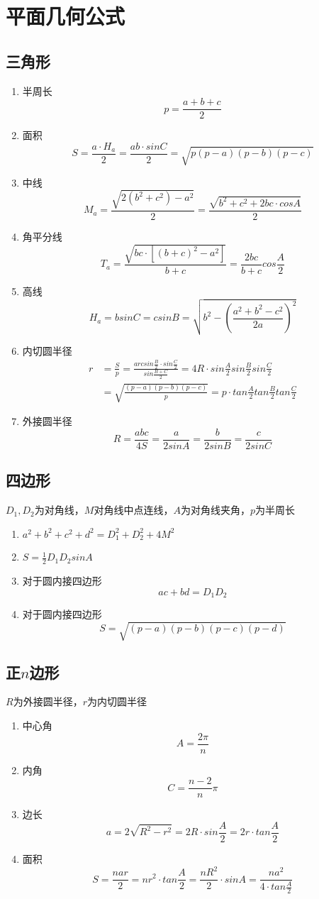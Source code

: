 \section{平面几何公式}
\subsection{三角形}
	\begin{enumerate}
		\item 半周长
			$$p=\frac{a+b+c}{2}$$
		\item 面积
			$$S=\frac{a \cdot H_a}{2}=\frac{ab \cdot sinC}{2}=\sqrt{p(p-a)(p-b)(p-c)}$$
		\item 中线
			$$M_a=\frac{\sqrt{2(b^2+c^2)-a^2}}{2}=\frac{\sqrt{b^2+c^2+2bc \cdot cosA}}{2}$$
		\item 角平分线 
			$$T_a=\frac{\sqrt{bc \cdot [(b+c)^2-a^2]}}{b+c}=\frac{2bc}{b+c}cos\frac{A}{2}$$
		\item 高线
			$$H_a=bsinC=csinB=\sqrt{b^2-(\frac{a^2+b^2-c^2}{2a})^2}$$
		\item 内切圆半径
			\begin{align*}
				r&=\frac{S}{p}=\frac{arcsin\frac{B}{2} \cdot sin\frac{C}{2}}{sin\frac{B+C}{2}}=4R \cdot sin\frac{A}{2}sin\frac{B}{2}sin\frac{C}{2}\\
				&=\sqrt{\frac{(p-a)(p-b)(p-c)}{p}}=p \cdot tan\frac{A}{2}tan\frac{B}{2}tan\frac{C}{2}
			\end{align*}
		\item 外接圆半径
			$$R=\frac{abc}{4S}=\frac{a}{2sinA}=\frac{b}{2sinB}=\frac{c}{2sinC}$$
	\end{enumerate}
\subsection{四边形}
	$D_1, D_2$为对角线，$M$对角线中点连线，$A$为对角线夹角，$p$为半周长
	\begin{enumerate}
		\item $a^2+b^2+c^2+d^2=D_1^2+D_2^2+4M^2$
		\item $S=\frac{1}{2}D_1D_2sinA$
		\item 对于圆内接四边形
			$$ac+bd=D_1D_2$$
		\item 对于圆内接四边形
			$$S=\sqrt{(p-a)(p-b)(p-c)(p-d)}$$
	\end{enumerate}
\subsection{正$n$边形}
	$R$为外接圆半径，$r$为内切圆半径
	\begin{enumerate}
		\item 中心角
			$$A=\frac{2\pi}{n}$$
		\item 内角
			$$C=\frac{n-2}{n}\pi$$
		\item 边长
			$$a=2\sqrt{R^2-r^2}=2R \cdot sin\frac{A}{2}=2r \cdot tan\frac{A}{2}$$
		\item 面积
			$$S=\frac{nar}{2}=nr^2 \cdot tan\frac{A}{2}=\frac{nR^2}{2} \cdot sinA=\frac{na^2}{4 \cdot tan\frac{A}{2}}$$
	\end{enumerate}
